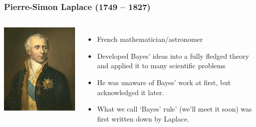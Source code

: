 \documentclass{beamer}
\begin{document}
\begin{frame}
\frametitle{Pierre-Simon Laplace (1749 -- 1827)}

    \begin{columns} %
        \includegraphics[width=1\linewidth]{images/laplace.jpg}

        \begin{itemize}
        \item French mathematician/astronomer\pause
        \item Developed Bayes' ideas into a fully fledged theory and applied it
              to many scientific problems\pause
        \item He was unaware of Bayes' work at first,
              but acknowledged it later.\pause
        \item What we call `Bayes' rule' (we'll meet it soon)
              was first written down by Laplace.
        \end{itemize}
     \end{columns}

\end{frame}
\end{document}

